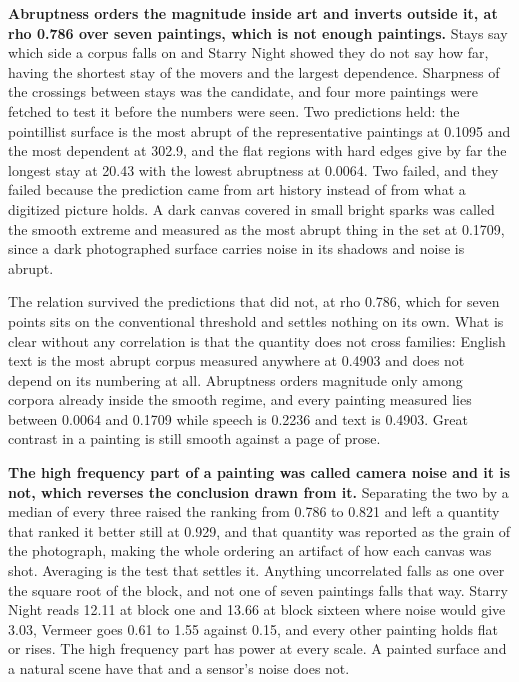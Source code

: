 \textbf{Abruptness orders the magnitude inside art and inverts outside it, at rho 0.786 over seven paintings, which is not enough paintings.} Stays say which side a corpus falls on and Starry Night showed they do not say how far, having the shortest stay of the movers and the largest dependence. Sharpness of the crossings between stays was the candidate, and four more paintings were fetched to test it before the numbers were seen. Two predictions held: the pointillist surface is the most abrupt of the representative paintings at 0.1095 and the most dependent at 302.9, and the flat regions with hard edges give by far the longest stay at 20.43 with the lowest abruptness at 0.0064. Two failed, and they failed because the prediction came from art history instead of from what a digitized picture holds. A dark canvas covered in small bright sparks was called the smooth extreme and measured as the most abrupt thing in the set at 0.1709, since a dark photographed surface carries noise in its shadows and noise is abrupt.

The relation survived the predictions that did not, at rho 0.786, which for seven points sits on the conventional threshold and settles nothing on its own. What is clear without any correlation is that the quantity does not cross families: English text is the most abrupt corpus measured anywhere at 0.4903 and does not depend on its numbering at all. Abruptness orders magnitude only among corpora already inside the smooth regime, and every painting measured lies between 0.0064 and 0.1709 while speech is 0.2236 and text is 0.4903. Great contrast in a painting is still smooth against a page of prose.

\textbf{The high frequency part of a painting was called camera noise and it is not, which reverses the conclusion drawn from it.} Separating the two by a median of every three raised the ranking from 0.786 to 0.821 and left a quantity that ranked it better still at 0.929, and that quantity was reported as the grain of the photograph, making the whole ordering an artifact of how each canvas was shot. Averaging is the test that settles it. Anything uncorrelated falls as one over the square root of the block, and not one of seven paintings falls that way. Starry Night reads 12.11 at block one and 13.66 at block sixteen where noise would give 3.03, Vermeer goes 0.61 to 1.55 against 0.15, and every other painting holds flat or rises. The high frequency part has power at every scale. A painted surface and a natural scene have that and a sensor's noise does not.

